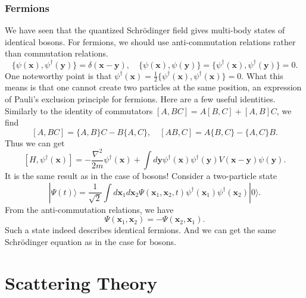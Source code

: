 \subsection{Fermions}
We have seen that the quantized Schr\"{o}dinger field gives multi-body states of identical bosons. For fermions, we should use anti-commutation relations rather than commutation relations.
\[\{\psi(\bm{x}),\psi^{\dagger}(\bm{y})\} = \delta(\bm{x}-\bm{y}) , \quad \{\psi(\bm{x}),\psi(\bm{y})\} = \{\psi^{\dagger}(\bm{x}),\psi^{\dagger}(\bm{y})\} = 0.\]
One noteworthy point is that $\psi^{\dagger}(\bm{x}) = \frac{1}{2}\{\psi^{\dagger}(\bm{x}),\psi^{\dagger}(\bm{x})\} = 0$. 
What this means is that one cannot create two particles at the same position, an expression of Pauli's exclusion principle for fermions.
Here are a few useful identities. Similarly to the identity of commutators $[A,BC] = A[B,C] + [A,B]C$, we find
\[[A,BC] = \{A,B\}C - B\{A,C\} , \quad [AB,C] = A\{B,C\} - \{A,C\}B.\]
Thus we can get
\[[H,\psi^{\dagger}(\bm{x})] = -\frac{\nabla^2}{2m}\psi^{\dagger}(\bm{x}) + \int d\bm{y} \psi^{\dagger}(\bm{x}) \psi^{\dagger}(\bm{y})V(\bm{x}-\bm{y})\psi(\bm{y}).\]
It is the same result as in the case of bosons!
Consider a two-particle state
\[|\Psi(t)\rangle = \frac{1}{\sqrt{2}} \int d\bm{x}_1 d\bm{x}_2 \Psi(\bm{x}_1,\bm{x}_2,t) \psi^{\dagger}(\bm{x}_1)\psi^{\dagger}(\bm{x}_2) |0\rangle.\]
From the anti-commutation relations, we have
\[\Psi(\bm{x}_1,\bm{x}_2) = - \Psi(\bm{x}_2,\bm{x}_1).\]
Such a state indeed describes identical fermions. And we can get the same Schr\"{o}dinger equation as in the case for bosons.

\chapter{Scattering Theory}
